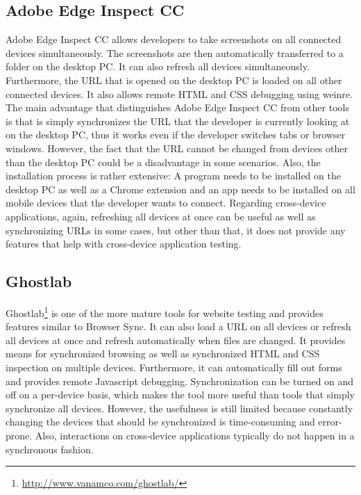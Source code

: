 \subsection{Adobe Edge Inspect CC}

Adobe Edge Inspect CC allows developers to take screenshots on all connected devices simultaneously. The screenshots are then automatically transferred to a folder on the desktop PC. It can also refresh all devices simultaneously. Furthermore, the URL that is opened on the desktop PC is loaded on all other connected devices. It also allows remote HTML and CSS debugging using weinre. The main advantage that distinguishes Adobe Edge Inspect CC from other tools is that is simply synchronizes the URL that the developer is currently looking at on the desktop PC, thus it works even if the developer switches tabs or browser windows. However, the fact that the URL cannot be changed from devices other than the desktop PC could be a disadvantage in some scenarios. Also, the installation process is rather extensive: A program needs to be installed on the desktop PC as well as a Chrome extension and an app needs to be installed on all mobile devices that the developer wants to connect. Regarding cross-device applications, again, refreshing all devices at once can be useful as well as synchronizing URLs in some cases, but other than that, it does not provide any features that help with cross-device application testing.

\subsection{Ghostlab}

Ghostlab\footnote{\url{http://www.vanamco.com/ghostlab/}} is one of the more mature tools for website testing and provides features similar to Browser Sync. It can also load a URL on all devices or refresh all devices at once and refresh automatically when files are changed. It provides means for synchronized browsing as well as synchronized HTML and CSS inspection on multiple devices. Furthermore, it can automatically fill out forms and provides remote Javascript debugging. Synchronization can be turned on and off on a per-device basis, which makes the tool more useful than tools that simply synchronize all devices. However, the usefulness is still limited because constantly changing the devices that should be synchronized is time-consuming and error-prone. Also, interactions on cross-device applications typically do not happen in a synchronous fashion.

